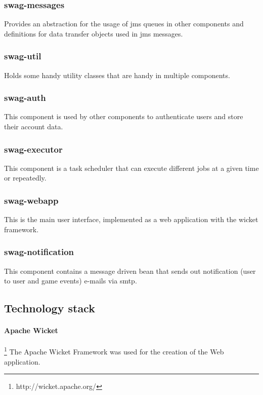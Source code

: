 \documentclass[a4paper]{article}
\begin{document}
\subsubsection{swag-messages}
Provides an abstraction for the usage of jms queues in other components and definitions for data transfer objects used in jms messages.

\subsubsection{swag-util}
Holds some handy utility classes that are handy in multiple components.

\subsubsection{swag-auth}

This component is used by other components to authenticate users and store their account data.

\subsubsection{swag-executor}

This component is a task scheduler that can execute different jobs at a given time or repeatedly.

\subsubsection{swag-webapp}

This is the main user interface, implemented as a web application with the wicket framework.

\subsubsection{swag-notification}

This component contains a message driven bean that sends out notification (user to user and game events)  e-mails via smtp.


\subsection{Technology stack}
\paragraph{Apache Wicket}\footnote{http://wicket.apache.org/}
The Apache Wicket Framework was used for the creation of the Web application.
\end{document}
